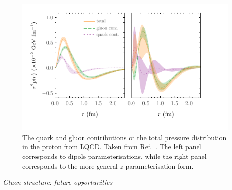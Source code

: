 \begin{figure}
	\centering
	\includegraphics[width=0.7\linewidth]{figures/combinedpressurelattnew.pdf}
	\caption{The quark and gluon contributions ot the total pressure distribution in the proton from LQCD. Taken from Ref.~\cite{Shanahan:2018pib}. The left panel corresponds to dipole parameterisations, while the right panel corresponds to the more general $z$-parameterisation form.}
	\label{gluefig}
\end{figure}






{\it Gluon structure: future opportunities}

